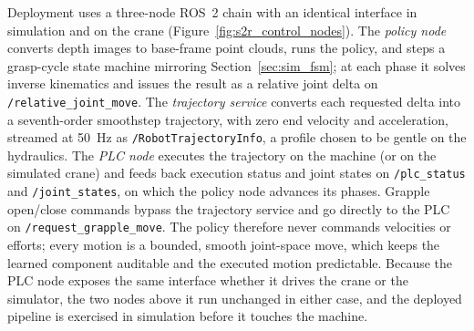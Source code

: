 Deployment uses a three-node ROS~2 chain with an identical interface in
simulation and on the crane (Figure~\ref{fig:s2r_control_nodes}). The
\emph{policy node} converts depth images to base-frame point clouds, runs the
policy, and steps a grasp-cycle state machine mirroring
Section~\ref{sec:sim_fsm}; at each phase it solves inverse kinematics and
issues the result as a relative joint delta on
\texttt{/relative\_joint\_move}. The \emph{trajectory service} converts each
requested delta into a seventh-order smoothstep trajectory, with zero end
velocity and acceleration, streamed at 50~Hz as
\texttt{/RobotTrajectoryInfo}, a profile chosen to be gentle on the
hydraulics. The \emph{PLC node} executes the trajectory on the machine (or on
the simulated crane) and feeds back execution status and joint states on
\texttt{/plc\_status} and \texttt{/joint\_states}, on which the policy node
advances its phases. Grapple open/close commands bypass the trajectory
service and go directly to the PLC on \texttt{/request\_grapple\_move}. The
policy therefore never commands velocities or efforts; every motion is a
bounded, smooth joint-space move, which keeps the learned component
auditable and the executed motion predictable. Because the PLC node exposes
the same interface whether it drives the crane or the simulator, the two
nodes above it run unchanged in either case, and the deployed pipeline is
exercised in simulation before it touches the machine.

